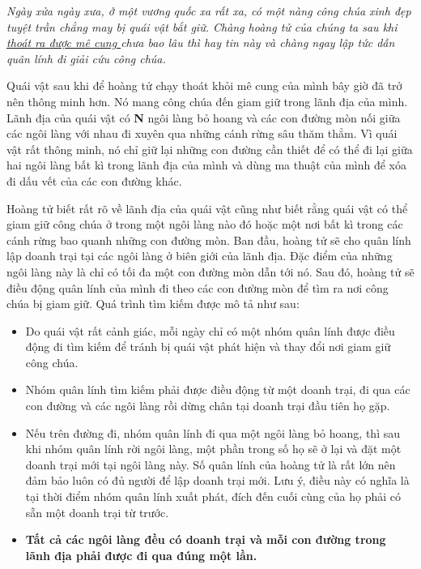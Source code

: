 

\emph{Ngày xửa ngày xưa, ở một vương quốc xa rất xa, có một nàng công chúa xinh đẹp tuyệt trần chẳng may bị quái vật bắt giữ. Chàng hoàng tử của chúng ta sau khi \href{vnoi.info/problems/show/VOBOARD2/}{ thoát ra được mê cung } chưa bao lâu thì hay tin này và chàng ngay lập tức dẫn quân lính đi giải cứu công chúa. }

Quái vật sau khi để hoàng tử chạy thoát khỏi mê cung của mình bây giờ đã trở nên thông minh hơn. Nó mang công chúa đến giam giữ trong lãnh địa của mình. Lãnh địa của quái vật có \textbf{ N } ngôi làng bỏ hoang và các con đường mòn nối giữa các ngôi làng với nhau đi xuyên qua những cánh rừng sâu thăm thẳm. Vì quái vật rất thông minh, nó chỉ giữ lại những con đường cần thiết để có thể đi lại giữa hai ngôi làng bất kì trong lãnh địa của mình và dùng ma thuật của mình để xóa đi dấu vết của các con đường khác.

Hoàng tử biết rất rõ về lãnh địa của quái vật cũng như biết rằng quái vật có thể giam giữ công chúa ở trong một ngôi làng nào đó hoặc một nơi bất kì trong các cánh rừng bao quanh những con đường mòn. Ban đầu, hoàng tử sẽ cho quân lính lập doanh trại tại các ngôi làng ở biên giới của lãnh địa. Đặc điểm của những ngôi làng này là chỉ có tối đa một con đường mòn dẫn tới nó. Sau đó, hoàng tử sẽ điều động quân lính của mình đi theo các con đường mòn để tìm ra nơi công chúa bị giam giữ. Quá trình tìm kiếm được mô tả như sau:
\begin{itemize}
	\item Do quái vật rất cảnh giác, mỗi ngày chỉ có một nhóm quân lính được điều động đi tìm kiếm để tránh bị quái vật phát hiện và thay đổi nơi giam giữ công chúa.
	\item Nhóm quân lính tìm kiếm phải được điều động từ một doanh trại, đi qua các con đường và các ngôi làng rồi dừng chân tại doanh trại đầu tiên họ gặp.
	\item Nếu trên đường đi, nhóm quân lính đi qua một ngôi làng bỏ hoang, thì sau khi nhóm quân lính rời ngôi làng, một phần trong số họ sẽ ở lại và đặt một doanh trại mới tại ngôi làng này. Số quân lính của hoàng tử là rất lớn nên đảm bảo luôn có đủ người để lập doanh trại mới. Lưu ý, điều này có nghĩa là tại thời điểm nhóm quân lính xuất phát, đích đến cuối cùng của họ phải có sẵn một doanh trại từ trước.
	\item \textbf{Tất cả các ngôi làng đều có doanh trại và mỗi con đường trong lãnh địa phải được đi qua đúng một lần. }
\end{itemize}

